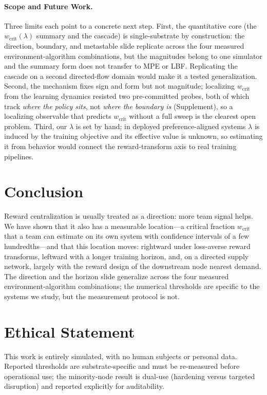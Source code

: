 \documentclass[letterpaper]{article} %
\theoremstyle{plain}
\newcommand{\wcrit}{w_{\mathrm{crit}}}
\begin{document}
\paragraph{Scope and Future Work.}
Three limits each point to a concrete next step. First, the quantitative core (the $\wcrit(\lambda)$
summary and the cascade) is single-substrate by construction: the direction, boundary, and
metastable slide replicate across the four measured environment-algorithm combinations, but the
magnitudes belong to one simulator and the summary form does not transfer to MPE or LBF. Replicating
the cascade on a second directed-flow domain would make it a tested generalization. Second, the
mechanism fixes sign and form but not magnitude; localizing $\wcrit$ from the learning dynamics
resisted two pre-committed probes, both of which track \emph{where the policy sits}, not \emph{where
the boundary is} (Supplement), so a localizing observable that predicts $\wcrit$ without a full sweep
is the clearest open problem. Third, our $\lambda$ is set by hand; in deployed preference-aligned
systems $\lambda$ is induced by the training objective and its effective value is unknown, so
estimating it from behavior would connect the reward-transform axis to real training pipelines.

\section{Conclusion}
\label{sec:conclusion}

Reward centralization is usually treated as a direction: more team signal helps. We have shown that
it also has a measurable location---a critical fraction $\wcrit$ that a team can estimate on its own
system with confidence intervals of a few hundredths---and that this location moves: rightward under
loss-averse reward transforms, leftward with a longer training horizon, and, on a directed supply
network, largely with the reward design of the downstream node nearest demand. The direction and the
horizon slide generalize across the four measured environment-algorithm combinations; the numerical
thresholds are specific to the systems we study, but the measurement protocol is not.

\section*{Ethical Statement}

This work is entirely simulated, with no human subjects or personal data. Reported thresholds are
substrate-specific and must be re-measured before operational use; the minority-node result is
dual-use (hardening versus targeted disruption) and reported explicitly for auditability.


\end{document}

